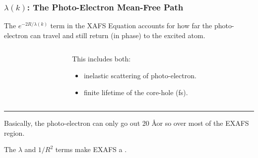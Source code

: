 \begin{frame} \frametitle{ $\lambda(k)$: The Photo-Electron Mean-Free Path }

 \begin{cenpage}{102mm}
  The $ e^{-2R/\lambda(k)} $ term in the XAFS Equation accounts for how far the
   photo-electron can travel and still return (in phase) to the excited atom.
 \begin{columns}
   \begin{column}{55mm}
   \end{column}
   \begin{column}{60mm}

     This includes both:

     \begin{itemize}
     \item  inelastic scattering of photo-electron.
     \item  finite lifetime of the core-hole (fs).
     \end{itemize}
     \vmm

   \end{column}
 \end{columns}

 \vmm\hrule\vmm

Basically, the photo-electron can only go out 20 \AA or so over most of the
EXAFS region. 

 \begin{postitbox}{80mm}
     The $\lambda$ and $1/R^{2}$ terms make EXAFS a  {}.
   \end{postitbox}

  \end{cenpage}
\end{frame}


